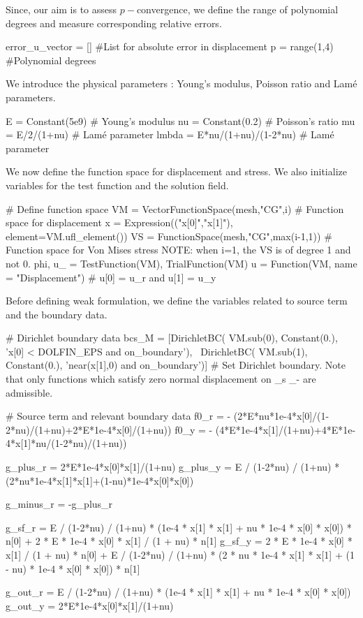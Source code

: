 Since, our aim is to assess $p-$convergence, we define the range of polynomial degrees and measure corresponding relative errors.
\begin{python}
error_u_vector = [] #List for absolute error in displacement
p = range(1,4) #Polynomial degrees
\end{python}

We introduce the physical parameters : Young's modulus, Poisson ratio and Lam\'e parameters.
\begin{python}
E = Constant(5e9) # Young's modulus
nu = Constant(0.2) # Poisson's ratio
mu = E/2/(1+nu) # Lam\'e parameter
lmbda = E*nu/(1+nu)/(1-2*nu) # Lam\'e parameter
\end{python}

We now define the function space for displacement and stress. We also initialize variables for the test function and the solution field.
\begin{python}
# Define function space
VM = VectorFunctionSpace(mesh,"CG",i) # Function space for displacement
x = Expression(("x[0]","x[1]"), element=VM.ufl_element())
VS = FunctionSpace(mesh,"CG",max(i-1,1)) 
# Function space for Von Mises stress NOTE: when i=1, the VS is of degree 1 and not 0.
phi, u_ = TestFunction(VM), TrialFunction(VM)
u = Function(VM, name = "Displacement") # u[0] = u_r and u[1] = u_y
\end{python}

Before defining weak formulation, we define the variables related to source term and the boundary data.
\begin{python}
# Dirichlet boundary data
bcs_M = [DirichletBC( VM.sub(0), Constant(0.), 'x[0] < DOLFIN_EPS and on_boundary'), \
	DirichletBC( VM.sub(1), Constant(0.), 'near(x[1],0) and on_boundary')] 
# Set Dirichlet boundary. Note that only functions which satisfy zero normal displacement on \gamma_s \cup \gamma_- are admissible.

# Source term and relevant boundary data
f0_r = - (2*E*nu*1e-4*x[0]/(1-2*nu)/(1+nu)+2*E*1e-4*x[0]/(1+nu)) 
f0_y = - (4*E*1e-4*x[1]/(1+nu)+4*E*1e-4*x[1]*nu/(1-2*nu)/(1+nu)) 

g_plus_r = 2*E*1e-4*x[0]*x[1]/(1+nu)
g_plus_y = E / (1-2*nu) / (1+nu) * (2*nu*1e-4*x[1]*x[1]+(1-nu)*1e-4*x[0]*x[0])

g_minus_r = -g_plus_r

g_sf_r = E / (1-2*nu) / (1+nu) * (1e-4 * x[1] * x[1] + nu * 1e-4 * x[0] * x[0]) * n[0] + 2 * E * 1e-4 * x[0] * x[1] / (1 + nu) * n[1]
g_sf_y = 2 * E * 1e-4 * x[0] * x[1] / (1 + nu) * n[0] + E / (1-2*nu) / (1+nu) * (2 * nu * 1e-4 * x[1] * x[1] + (1 - nu) * 1e-4 * x[0] * x[0]) * n[1]

g_out_r = E / (1-2*nu) / (1+nu) * (1e-4 * x[1] * x[1] + nu * 1e-4 * x[0] * x[0])
g_out_y = 2*E*1e-4*x[0]*x[1]/(1+nu)
\end{python}

